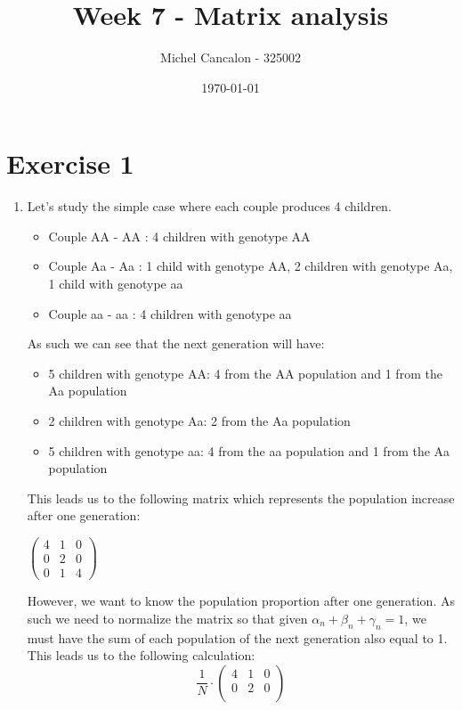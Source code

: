 \documentclass[11pt, legalpaper]{article}
\title{Week 7 - Matrix analysis}
\author{Michel Cancalon - 325002}
\date{\today}
\begin{document}
\maketitle

\section{Exercise 1}
\begin{enumerate}
    \item Let's study the simple case where each couple produces 4 children. \\
    \begin{itemize}
        \item Couple AA - AA : 4 children with genotype AA
        \item Couple Aa - Aa : 1 child with genotype AA, 2 children with genotype Aa, 1 child with genotype aa
        \item Couple aa - aa : 4 children with genotype aa
    \end{itemize}
    As such we can see that the next generation will have:
    \begin{itemize}
        \item 5 children with genotype AA: 4 from the AA population and 1 from the Aa population
        \item 2 children with genotype Aa: 2 from the Aa population
        \item 5 children with genotype aa: 4 from the aa population and 1 from the Aa population
    \end{itemize}
    This leads us to the following matrix which represents the population increase after one generation:
    \begin{center}
        $\begin{pmatrix}
            4 & 1 & 0 \\
            0 & 2 & 0 \\
            0 & 1 & 4
        \end{pmatrix}$
    \end{center}
    However, we want to know the population proportion after one generation. As such we need to normalize the matrix so that given $\alpha_n + \beta_n + \gamma_n = 1$, we must have the sum of each population of the next generation also equal to 1. This leads us to the following calculation:
    $$\frac{1}{N}\cdot \begin{pmatrix}
        4 & 1 & 0 \\
        0 & 2 & 0 \\

\end{pmatrix}$$
\end{enumerate}
\end{document}
